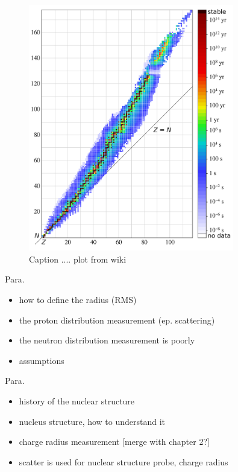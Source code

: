 \begin{figure}
    \centering
    \includegraphics[width=0.8\textwidth]{images/chap1/Isotopes_and_half-life.svg.png}
    \caption{Caption .... plot from wiki}
    \label{fig:isotopes_proton_neutron_ratio}
\end{figure}

Para. 

\begin{itemize}
    \item how to define the radius (RMS)
    \item the proton distribution measurement (ep. scattering)
    \item the neutron distribution measurement is poorly 
    \item assumptions
\end{itemize}


Para.

\begin{itemize}
\item history of the nuclear structure
    \item nucleus structure, how to understand it
    \item charge radius measurement [merge with chapter 2?]
    \item scatter is used for nuclear structure probe, charge radius 
\end{itemize}


